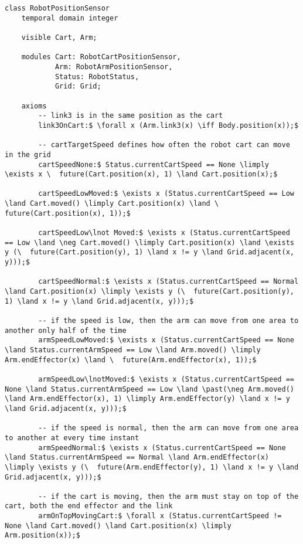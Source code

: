 \begin{lstlisting}[fontadjust, mathescape, frame=single] 
class RobotPositionSensor
    temporal domain integer

    visible Cart, Arm;

    modules Cart: RobotCartPositionSensor,
            Arm: RobotArmPositionSensor,
            Status: RobotStatus,
            Grid: Grid;

    axioms
        -- link3 is in the same position as the cart
        link3OnCart:$ \forall x (Arm.link3(x) \iff Body.position(x));$

        -- cartTargetSpeed defines how often the robot cart can move in the grid
        cartSpeedNone:$ Status.currentCartSpeed == None \limply \exists x \  future(Cart.position(x), 1) \land Cart.position(x);$

        cartSpeedLowMoved:$ \exists x (Status.currentCartSpeed == Low \land Cart.moved() \limply Cart.position(x) \land \  future(Cart.position(x), 1));$

        cartSpeedLow\lnot Moved:$ \exists x (Status.currentCartSpeed == Low \land \neg Cart.moved() \limply Cart.position(x) \land \exists y (\  future(Cart.position(y), 1) \land x != y \land Grid.adjacent(x, y)));$

        cartSpeedNormal:$ \exists x (Status.currentCartSpeed == Normal \land Cart.position(x) \limply \exists y (\  future(Cart.position(y), 1) \land x != y \land Grid.adjacent(x, y)));$

        -- if the speed is low, then the arm can move from one area to another only half of the time
        armSpeedLowMoved:$ \exists x (Status.currentCartSpeed == None \land Status.currentArmSpeed == Low \land Arm.moved() \limply Arm.endEffector(x) \land \  future(Arm.endEffector(x), 1));$

        armSpeedLow\lnotMoved:$ \exists x (Status.currentCartSpeed == None \land Status.currentArmSpeed == Low \land \past(\neg Arm.moved() \land Arm.endEffector(x), 1) \limply Arm.endEffector(y) \land x != y \land Grid.adjacent(x, y)));$

        -- if the speed is normal, then the arm can move from one area to another at every time instant
        armSpeedNormal:$ \exists x (Status.currentCartSpeed == None \land Status.currentArmSpeed == Normal \land Arm.endEffector(x) \limply \exists y (\  future(Arm.endEffector(y), 1) \land x != y \land Grid.adjacent(x, y)));$

        -- if the cart is moving, then the arm must stay on top of the cart, both the end effector and the link
        armOnTopMovingCart:$ \forall x (Status.currentCartSpeed != None \land Cart.moved() \land Cart.position(x) \limply Arm.position(x));$


\end{lstlisting}
